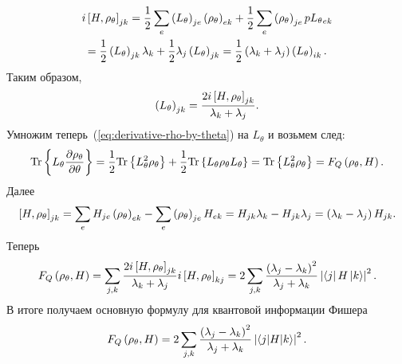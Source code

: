 %
\begin{multline}%
  i \left[H,\rho_\theta \right]_{jk}
  = \frac{1}{2} \sum_e \p{L_\theta }_{je}
    \p{\rho_\theta }_{ek} +
    \frac{1}{2} \sum_e \p{\rho_\theta }_{je}
    p{L_\theta }_{ek} \\
  = \frac{1}{2}\p{L_\theta }_{jk} \lambda_k
  + \frac{1}{2}\lambda_j \p{L_\theta }_{jk}
  = \frac{1}{2} \p{\lambda_k + \lambda_j }
    \p{L_\theta }_{ik}.
\end{multline}
%
Таким образом,
\begin{equation}%
  \p{L_\theta }_{jk}
  = \frac{2i\left[H,\rho_\theta \right]_{jk}}{\lambda_k + \lambda_j}.
\end{equation}
%
Умножим теперь~(\ref{eq:derivative-rho-by-theta}) на $L_\theta$ и возьмем след:
%
\begin{equation}%
  \tr{
    L_\theta \frac{\partial \rho_\theta}{\partial \theta}
  }
  = \frac{1}{2} \tr{L^2_\theta \rho_\theta}
  + \frac{1}{2} \tr{L_\theta \rho_\theta L_\theta}
  = \tr{L^2_\theta \rho_\theta}
  = F_Q \p{\rho_\theta, H}.
\end{equation}
%
Далее
%
\begin{equation}%
  \left[H, \rho_\theta \right]_{jk}
  = \sum_e H_{je} \p{\rho_\theta }_{ek}
  - \sum_e \p{\rho_\theta }_{je}H_{ek}
  = H_{jk}\lambda_k - H_{jk}\lambda_j
  = \p{\lambda_k - \lambda_j } H_{jk}.
\end{equation}
%
Теперь
%
\begin{equation}%
  F_Q \p{\rho_\theta, H }
  = \sum_{j,k}\frac{2i\left[H,\rho_\theta \right]_{jk}}{\lambda_k + \lambda_j}
    i \left[H, \rho_\theta \right]_{kj}
  = 2\sum_{j,k} \frac{\p{\lambda_j - \lambda_k }^2}{\lambda_j + \lambda_k}
    \abs{\bra{j} H \ket{k}}^2.
\end{equation}
%
В итоге получаем основную формулу для квантовой информации Фишера
%
\begin{equation}\label{eq:quantum-fisher-information}
        F_Q \left( \rho_\theta, H  \right) =
            2\sum_{j,k} \frac{\left( \lambda_j - \lambda_k  \right)^2}
                {\lambda_j + \lambda_k}
            \left| \langle j|H|k \rangle \right|^2.
\end{equation}

